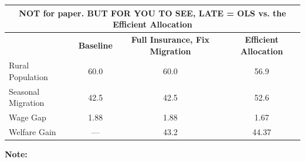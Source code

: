 \documentclass[12pt,pdftex]{article}
\renewcommand{\arraystretch}{1.1}
\begin{document}
\begin{onehalfspacing}
\begin{table}[h!]
\small
\setlength {\tabcolsep}{1.5mm}
\renewcommand{\arraystretch}{2.30}
\begin{center}\label{tb:effecient}
\begin{tabular}{l c c c }
\multicolumn{4}{c}{\normalsize \textbf{NOT for paper. BUT FOR YOU TO SEE, LATE = OLS vs. the Efficient Allocation}}\\
\hline
\hline
\footnotesize   & \footnotesize  \textbf{Baseline} & \footnotesize   \textbf{Full Insurance, Fix Migration} &  \footnotesize \textbf{Efficient Allocation} \\
\cmidrule(lr){2-2} \cmidrule(lr){3-3} \cmidrule(lr){4-4}
\footnotesize  Rural Population  & 60.0  & 60.0   & 56.9      \\
\footnotesize  Seasonal Migration & 42.5   & 42.5 & 52.6 \\
\footnotesize  Wage Gap  & 1.88  & 1.88  & 1.67     \\
\footnotesize Welfare Gain & --- & 43.2 & 44.37 \\
\hline
\end{tabular}
\parbox[c]{6.75in}{\vspace{.1cm}
{\footnotesize \textbf{Note:} }}
\end{center}
\end{table}


\newpage



\newpage






\end{onehalfspacing}
\end{document}
